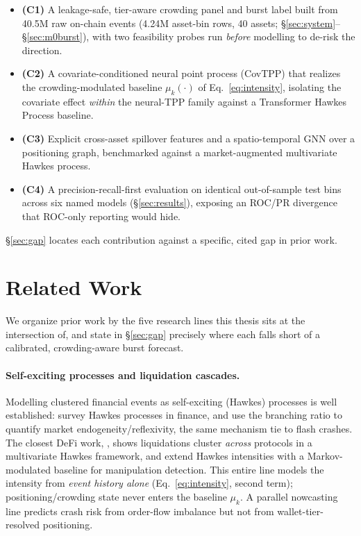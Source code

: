 \documentclass[11pt,a4paper]{article}
\begin{document}
\begin{itemize}[nosep]
    \item \textbf{(C1)} A leakage-safe, tier-aware crowding panel and burst label built from 40.5M raw on-chain events (4.24M asset-bin rows, 40 assets; \S\ref{sec:system}--\S\ref{sec:m0burst}), with two feasibility probes run \emph{before} modelling to de-risk the direction.
    \item \textbf{(C2)} A covariate-conditioned neural point process (CovTPP) that realizes the crowding-modulated baseline $\mu_k(\cdot)$ of Eq.~\eqref{eq:intensity}, isolating the covariate effect \emph{within} the neural-TPP family against a Transformer Hawkes Process baseline.
    \item \textbf{(C3)} Explicit cross-asset spillover features and a spatio-temporal GNN over a positioning graph, benchmarked against a market-augmented multivariate Hawkes process.
    \item \textbf{(C4)} A precision-recall-first evaluation on identical out-of-sample test bins across six named models (\S\ref{sec:results}), exposing an ROC/PR divergence that ROC-only reporting would hide.
\end{itemize}

\S\ref{sec:gap} locates each contribution against a specific, cited gap in prior work.

\section{Related Work}
\label{sec:related}

We organize prior work by the five research lines this thesis sits at the intersection of, and state in \S\ref{sec:gap} precisely where each falls short of a calibrated, crowding-aware burst forecast.

\paragraph{Self-exciting processes and liquidation cascades.} Modelling clustered financial events as self-exciting (Hawkes) processes is well established: \citet{bacry2015hawkes} survey Hawkes processes in finance, and \citet{hardiman2013endogeneity} use the branching ratio to quantify market endogeneity/reflexivity, the same mechanism \citet{filimonov2012reflexivity} tie to flash crashes. The closest DeFi work, \citet{cao2025defi}, shows liquidations cluster \emph{across} protocols in a multivariate Hawkes framework, and \citet{markovhawkes2025manipulation} extend Hawkes intensities with a Markov-modulated baseline for manipulation detection. This entire line models the intensity from \emph{event history alone} (Eq.~\eqref{eq:intensity}, second term); positioning/crowding state never enters the baseline $\mu_k$. A parallel nowcasting line \citep{nowcast2023crashrisk} predicts crash risk from order-flow imbalance but not from wallet-tier-resolved positioning.
\end{document}
